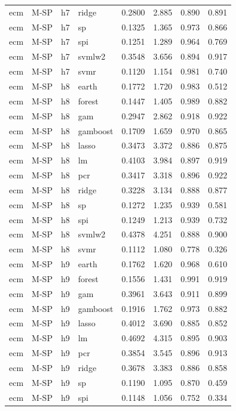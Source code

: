 \begin{ThreePartTable}
\begin{longtable}[t]{llclcccc}
ecm & M-SP & h7 & ridge & 0.2800 & 2.885 & 0.890 & 0.891\\
ecm & M-SP & h7 & sp & 0.1325 & 1.365 & 0.973 & 0.866\\
ecm & M-SP & h7 & spi & 0.1251 & 1.289 & 0.964 & 0.769\\
ecm & M-SP & h7 & svmlw2 & 0.3548 & 3.656 & 0.894 & 0.917\\
ecm & M-SP & h7 & svmr & 0.1120 & 1.154 & 0.981 & 0.740\\
\addlinespace
ecm & M-SP & h8 & earth & 0.1772 & 1.720 & 0.983 & 0.512\\
ecm & M-SP & h8 & forest & 0.1447 & 1.405 & 0.989 & 0.882\\
ecm & M-SP & h8 & gam & 0.2947 & 2.862 & 0.918 & 0.922\\
ecm & M-SP & h8 & gamboost & 0.1709 & 1.659 & 0.970 & 0.865\\
ecm & M-SP & h8 & lasso & 0.3473 & 3.372 & 0.886 & 0.875\\
ecm & M-SP & h8 & lm & 0.4103 & 3.984 & 0.897 & 0.919\\
ecm & M-SP & h8 & pcr & 0.3417 & 3.318 & 0.896 & 0.922\\
ecm & M-SP & h8 & ridge & 0.3228 & 3.134 & 0.888 & 0.877\\
ecm & M-SP & h8 & sp & 0.1272 & 1.235 & 0.939 & 0.581\\
ecm & M-SP & h8 & spi & 0.1249 & 1.213 & 0.939 & 0.732\\
ecm & M-SP & h8 & svmlw2 & 0.4378 & 4.251 & 0.888 & 0.900\\
ecm & M-SP & h8 & svmr & 0.1112 & 1.080 & 0.778 & 0.326\\
\addlinespace
ecm & M-SP & h9 & earth & 0.1762 & 1.620 & 0.968 & 0.610\\
ecm & M-SP & h9 & forest & 0.1556 & 1.431 & 0.991 & 0.919\\
ecm & M-SP & h9 & gam & 0.3961 & 3.643 & 0.911 & 0.899\\
ecm & M-SP & h9 & gamboost & 0.1916 & 1.762 & 0.973 & 0.882\\
ecm & M-SP & h9 & lasso & 0.4012 & 3.690 & 0.885 & 0.852\\
ecm & M-SP & h9 & lm & 0.4692 & 4.315 & 0.895 & 0.903\\
ecm & M-SP & h9 & pcr & 0.3854 & 3.545 & 0.896 & 0.913\\
ecm & M-SP & h9 & ridge & 0.3678 & 3.383 & 0.886 & 0.858\\
ecm & M-SP & h9 & sp & 0.1190 & 1.095 & 0.870 & 0.459\\
ecm & M-SP & h9 & spi & 0.1148 & 1.056 & 0.752 & 0.334\\

\end{longtable}
\end{ThreePartTable}
